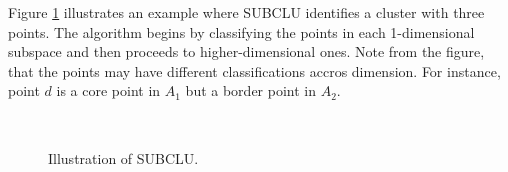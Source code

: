 Figure \ref{fig:subclu} illustrates an example where SUBCLU identifies a cluster with three points. The algorithm begins by classifying the points in each 1-dimensional subspace and then proceeds to higher-dimensional ones. Note from the figure, that the points may have different classifications accros dimension. For instance, point $d$ is a core point in $A_1$ but a border point in $A_2$.
\begin{figure}[H]
    \vspace*{-0.6cm}
    \centering
    ~~~~
    ~
    \caption{Illustration of SUBCLU.}
    \label{fig:subclu}
    \vspace*{-0.4cm}
\end{figure}